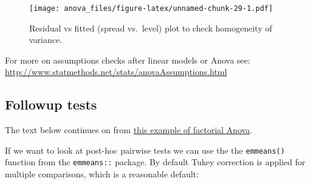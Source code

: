 \documentclass[]{article}
\begin{document}
\begin{figure}
\centering
\texttt{[image: anova\_files/figure-latex/unnamed-chunk-29-1.pdf]}
\caption{\label{fig:unnamed-chunk-29}Residual vs fitted (spread vs.~level) plot to check homogeneity of variance.}
\end{figure}

For more on assumptions checks after linear models or Anova see:
\url{http://www.statmethods.net/stats/anovaAssumptions.html}

\hypertarget{followup-tests}{%
\subsection*{Followup tests}\label{followup-tests}}

{The text below continues on from
\protect\hyperlink{howell-factorial-example}{this example of factorial Anova}.}

If we want to look at post-hoc pairwise tests we can use the the \texttt{emmeans()}
function from the \texttt{emmeans::} package. By default Tukey correction is applied
for multiple comparisons, which is a reasonable default:
\end{document}
